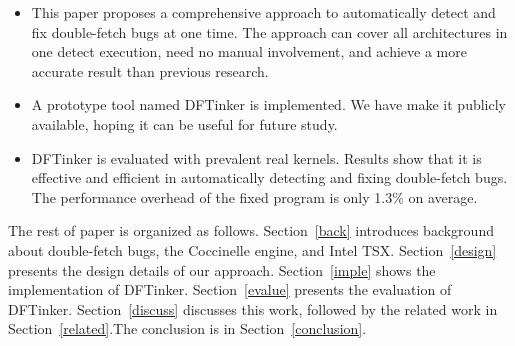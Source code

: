 \documentclass[10pt]{llncs}
\begin{document}


\begin{itemize}
\item  This paper proposes a comprehensive approach to automatically detect and fix double-fetch bugs at one time.  %
The approach can cover all architectures in one detect execution, need no manual involvement, and achieve a more accurate result than previous research. 
 
\item A prototype tool named DFTinker is implemented. We have make it publicly available, hoping it can be useful for future study.

\item  DFTinker is evaluated with prevalent real kernels. Results show that it is effective and efficient in automatically detecting and fixing double-fetch bugs. The performance overhead of the fixed program is only 1.3\% on average.


\end{itemize}
The rest of paper is organized as follows. Section~\ref{back} introduces background about double-fetch bugs, the Coccinelle engine, and Intel TSX. Section~\ref{design} presents the design details of our approach. %
Section~\ref{imple} shows the implementation of DFTinker. %
Section~\ref{evalue} presents the evaluation of DFTinker.%
Section~\ref{discuss} discusses this work, followed by the related work in Section~\ref{related}.The conclusion is in Section~\ref{conclusion}.
\end{document}

